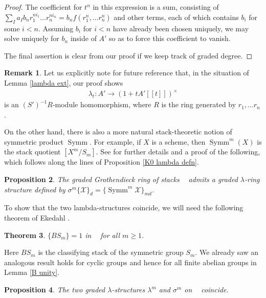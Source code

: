 \documentclass{amsart}
\newtheorem{thm}{Theorem}[section]
\newtheorem{prop}[thm]{Proposition}
\theoremstyle{definition}
\newtheorem{rmk}[thm]{Remark}
\DeclareMathOperator{\Stk}{Stk}
\DeclareMathOperator{\Symm}{Symm}
\DeclareMathOperator{\Kstk}{K_0(\Stk_k^{\dim})}
\numberwithin{equation}{section}
\begin{document}
\begin{proof}
The coefficient for $t^n$ in this expression is a sum, consisting of $\sum_I a_I b_n r_1^{n i_1} \ldots r_n^{n i_n} = b_n f(r_1^n, \ldots r_n^n)$ and other terms, each of which contains $b_i$ for some $i<n$. Assuming $b_i$ for $i<n$ have already been chosen uniquely, we may solve uniquely for $b_n$ inside of $A'$ so as to force this coefficient to vanish.

The final assertion is clear from our proof if we keep track of graded degree.
\end{proof}


\begin{rmk}\label{lambda extn rmk}
Let us explicitly note for future reference that, in the situation of Lemma \ref{lambda ext}, our proof shows 
\begin{align*}
    \lambda_t: A' \rightarrow (1+tA'[[t]])^\times
\end{align*}
is an $(S')^{-1}R$-module homomorphism, where $R$ is the ring generated by $r_1,\ldots r_n$.
\end{rmk}

On the other hand, there is also a more natural stack-theoretic notion of symmetric product $\Symm$. For example, if $X$ is a scheme, then $\Symm^m(X)$ is the stack quotient $[X^m/S_m]$. See \cite{ekedahlgroup} for further details and a proof of the following, which follows along the lines of Proposition \ref{K0 lambda defn}.

\begin{prop}
The graded Grothendieck ring of stacks $\Kstk$ admits a graded $\lambda$-ring structure defined by $\sigma^m \{ \mathscr{X} \}_d = \{ \Symm^m \mathscr{X} \}_{md}$.
\end{prop}

To show that the two lambda-structures coincide, we will need the following theorem of Ekedahl \cite[Theorem $4.3$]{ekedahlgroup}.

\begin{thm}\label{B S_m}
$\{ BS_m \} = 1$ in $\Kstk$ for all $m \geq 1$.
\end{thm}
Here $B S_m$ is the classifying stack of the symmetric group $S_m$. We already saw an analogous result holds for cyclic groups and hence for all finite abelian groups in Lemma \ref{B unity}.

\begin{prop}\label{coincide}
The two graded $\lambda$-structures $\lambda^m$ and $\sigma^m$ on $\Kstk$ coincide.
\end{prop}
\end{document}
